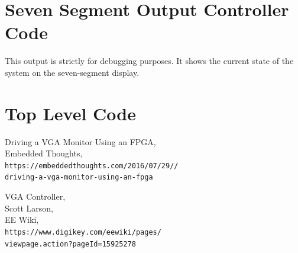 \documentclass[11pt]{article}
\begin{document}
\begin{appendices}


\section{Seven Segment Output Controller Code}

This output is strictly for debugging purposes. It shows the current state of the system on the seven-segment display.



\section{Top Level Code}



\end{appendices}

\pagebreak

\begin{thebibliography}{9}

  Driving a VGA Monitor Using an FPGA, \\
  Embedded Thoughts, \\
  \verb!https://embeddedthoughts.com/2016/07/29//! \\
  \verb!driving-a-vga-monitor-using-an-fpga!
 
  VGA Controller, \\
  Scott Larson, \\
  EE Wiki, \\
  \verb!https://www.digikey.com/eewiki/pages/! \\
  \verb!viewpage.action?pageId=15925278!
\end{thebibliography}
\end{document}
